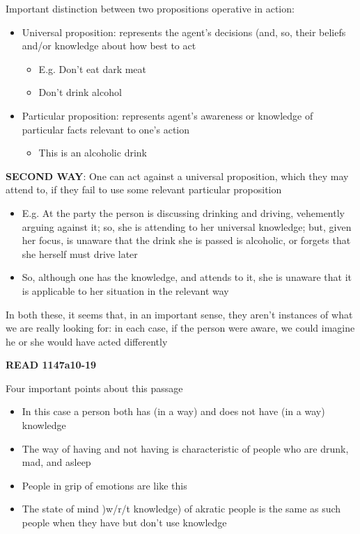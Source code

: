\documentclass[11pt]{article}
\begin{document}
\noindent Important distinction between two propositions operative in action:

\begin{itemize}\item{Universal proposition: represents the agent's decisions (and, so, their beliefs and/or knowledge about how best to act}\begin{itemize}\item{E.g. Don't eat dark meat}\item{Don't drink alcohol}\end{itemize}\item{Particular proposition: represents agent's awareness or knowledge of particular facts relevant to one's action}\begin{itemize}\item{This is an alcoholic drink}\end{itemize}\end{itemize}

\noindent\textbf{SECOND WAY}: One can act against a universal proposition, which they may attend to, if they fail to use some relevant particular proposition

\begin{itemize}\item{E.g. At the party the person is discussing drinking and driving, vehemently arguing against it; so, she is attending to her universal knowledge; but, given her focus, is unaware that the drink she is passed is alcoholic, or forgets that she herself must drive later}\item{So, although one has the knowledge, and attends to it, she is unaware that it is applicable to her situation in the relevant way}\end{itemize}

\noindent In both these, it seems that, in an important sense, they aren't instances of what we are really looking for: in each case, if the person were aware, we could imagine he or she would have acted differently
\vspace*{2mm}

\noindent \textbf{READ 1147a10-19}
\vspace*{2mm}

\noindent Four important points about this passage
\begin{itemize}\item{In this case a person both has (in a way) and does not have (in a way) knowledge}\item{The way of having and not having is characteristic of people who are drunk, mad, and asleep}\item{People in grip of emotions are like this}\item{The state of mind )w/r/t knowledge) of akratic people is the same as such people when they have but don't use knowledge}\end{itemize}
\end{document}
